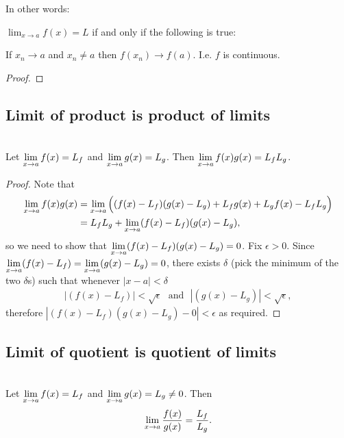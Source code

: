 \begin{intuition*}
  In other words:

  $\lim_{x \to a} f(x) = L$ if and only if the following is true:

  If $x_n \to a$ and $x_n \neq a$ then $f(x_n) \to f(a)$. I.e. $f$ is continuous.
\end{intuition*}

\begin{proof}

\end{proof}

\subsection{Limit of product is product of limits}
\begin{theorem*}\label{limit-of-product}~\\
  Let $\limxa f(x) = L_f$ and $\limxa g(x) = L_g$. Then
  $\limxa f(x)g(x) = L_fL_g$.
\end{theorem*}

\begin{proof}
  Note that
  \begin{align*}
    \limxa f(x)g(x) &= \limxa \Big((f(x) - L_f)(g(x) - L_g) + L_fg(x) + L_gf(x) - L_fL_g\Big)\\
                    &= L_fL_g + \limxa (f(x) - L_f)(g(x) - L_g),
  \end{align*}
  so we need to show that $\limxa (f(x) - L_f)(g(x) - L_g) = 0$. Fix $\epsilon > 0$. Since
  $\limxa (f(x) - L_f) = \limxa (g(x) - L_g) = 0$, there exists $\delta$ (pick the minimum of the
  two $\delta$s) such that whenever $|x - a| < \delta$
  \begin{align*}
    |(f(x) - L_f)| < \sqrt \epsilon ~~~\text{and}~~~|(g(x) - L_g)| < \sqrt \epsilon,
  \end{align*}
  therefore $|(f(x) - L_f)(g(x) - L_g) - 0| < \epsilon$ as required.
\end{proof}

\subsection{Limit of quotient is quotient of limits}
\begin{theorem*}~\\
  Let $\limxa f(x) = L_f$ and $\limxa g(x) = L_g \neq 0$. Then
  \begin{align*}
    \limxa \frac{f(x)}{g(x)} = \frac{L_f}{L_g}.
  \end{align*}
\end{theorem*}

